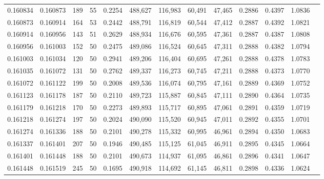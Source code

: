 \begin{tabular}{rrrrrrrrrrrrr}
0.160834 & 0.160873 &   189 &  55 &                                     0.2254 & 488,627 & 116,983 &  60,491 &  47,465 & 0.2886 & 0.4397 & 1.0836 \\
0.160873 & 0.160914 &   164 &  53 &                                     0.2442 & 488,791 & 116,819 &  60,544 &  47,412 & 0.2887 & 0.4392 & 1.0821 \\
0.160914 & 0.160956 &   143 &  51 &                                     0.2629 & 488,934 & 116,676 &  60,595 &  47,361 & 0.2887 & 0.4387 & 1.0808 \\
0.160956 & 0.161003 &   152 &  50 &                                     0.2475 & 489,086 & 116,524 &  60,645 &  47,311 & 0.2888 & 0.4382 & 1.0794 \\
0.161003 & 0.161034 &   120 &  50 &                                     0.2941 & 489,206 & 116,404 &  60,695 &  47,261 & 0.2888 & 0.4378 & 1.0783 \\
0.161035 & 0.161072 &   131 &  50 &                                     0.2762 & 489,337 & 116,273 &  60,745 &  47,211 & 0.2888 & 0.4373 & 1.0770 \\
0.161072 & 0.161122 &   199 &  50 &                                     0.2008 & 489,536 & 116,074 &  60,795 &  47,161 & 0.2889 & 0.4369 & 1.0752 \\
0.161123 & 0.161178 &   187 &  50 &                                     0.2110 & 489,723 & 115,887 &  60,845 &  47,111 & 0.2890 & 0.4364 & 1.0735 \\
0.161179 & 0.161218 &   170 &  50 &                                     0.2273 & 489,893 & 115,717 &  60,895 &  47,061 & 0.2891 & 0.4359 & 1.0719 \\
0.161218 & 0.161274 &   197 &  50 &                                     0.2024 & 490,090 & 115,520 &  60,945 &  47,011 & 0.2892 & 0.4355 & 1.0701 \\
0.161274 & 0.161336 &   188 &  50 &                                     0.2101 & 490,278 & 115,332 &  60,995 &  46,961 & 0.2894 & 0.4350 & 1.0683 \\
0.161337 & 0.161401 &   207 &  50 &                                     0.1946 & 490,485 & 115,125 &  61,045 &  46,911 & 0.2895 & 0.4345 & 1.0664 \\
0.161401 & 0.161448 &   188 &  50 &                                     0.2101 & 490,673 & 114,937 &  61,095 &  46,861 & 0.2896 & 0.4341 & 1.0647 \\
0.161448 & 0.161519 &   245 &  50 &                                     0.1695 & 490,918 & 114,692 &  61,145 &  46,811 & 0.2898 & 0.4336 & 1.0624 \\

\end{tabular}
